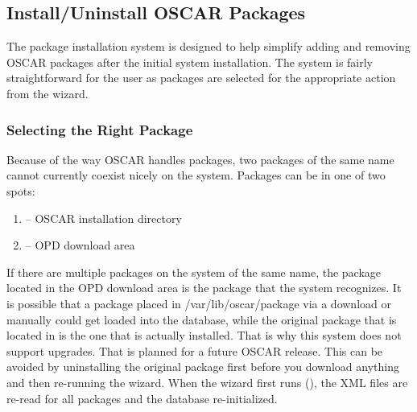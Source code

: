 
\subsection{Install/Uninstall OSCAR Packages}
\label{det:install-uninstall-packages}

\begchange The package installation system is designed to help
simplify adding and removing OSCAR packages after the initial system
installation. The system is fairly straightforward for the user as
packages are selected for the appropriate action from the wizard.
\endchange

\subsubsection{Selecting the Right Package}
\label{det:select-package}

Because of the way OSCAR handles packages, two packages of the same
name cannot currently coexist nicely on the system.  Packages can be
in one of two spots:

\begin{enumerate}

\item {} -- OSCAR installation directory
\item {} -- OPD download area

\end{enumerate}

If there are multiple packages on the system of the same name, the package
located in the OPD download area is the package that the system recognizes.
It is possible that a package placed in /var/lib/oscar/package via a download
or manually could get loaded into the database, while the original package
that is located in  is the one that is actually
installed.  That is why this system does not support upgrades.  That is
planned for a future OSCAR release.  This can be avoided by uninstalling the
original package first before you download anything and then re-running the
wizard.  When the wizard first runs (), the
XML files are re-read for all packages and the database re-initialized.


